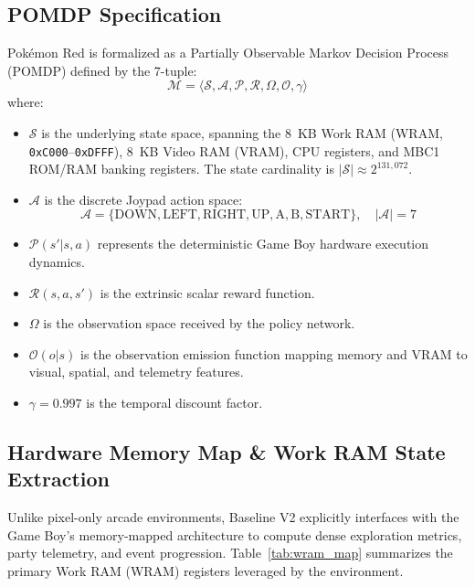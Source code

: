 \documentclass[conference]{IEEEtran}
\begin{document}
\subsection{POMDP Specification}
Pok{\'e}mon Red is formalized as a Partially Observable Markov Decision Process (POMDP) defined by the 7-tuple:
\begin{equation}
\mathcal{M} = \langle \mathcal{S}, \mathcal{A}, \mathcal{P}, \mathcal{R}, \Omega, \mathcal{O}, \gamma \rangle
\end{equation}
where:
\begin{itemize}
    \item $\mathcal{S}$ is the underlying state space, spanning the 8~KB Work RAM (WRAM, \texttt{0xC000}--\texttt{0xDFFF}), 8~KB Video RAM (VRAM), CPU registers, and MBC1 ROM/RAM banking registers. The state cardinality is $|\mathcal{S}| \approx 2^{131{,}072}$.
    \item $\mathcal{A}$ is the discrete Joypad action space:
    $$\mathcal{A} = \{ \text{DOWN}, \text{LEFT}, \text{RIGHT}, \text{UP}, \text{A}, \text{B}, \text{START} \}, \quad |\mathcal{A}| = 7$$
    \item $\mathcal{P}(s' | s, a)$ represents the deterministic Game Boy hardware execution dynamics.
    \item $\mathcal{R}(s, a, s')$ is the extrinsic scalar reward function.
    \item $\Omega$ is the observation space received by the policy network.
    \item $\mathcal{O}(o | s)$ is the observation emission function mapping memory and VRAM to visual, spatial, and telemetry features.
    \item $\gamma = 0.997$ is the temporal discount factor.
\end{itemize}

\subsection{Hardware Memory Map \& Work RAM State Extraction}
Unlike pixel-only arcade environments, Baseline V2 explicitly interfaces with the Game Boy's memory-mapped architecture to compute dense exploration metrics, party telemetry, and event progression. Table~\ref{tab:wram_map} summarizes the primary Work RAM (WRAM) registers leveraged by the environment.
\end{document}
